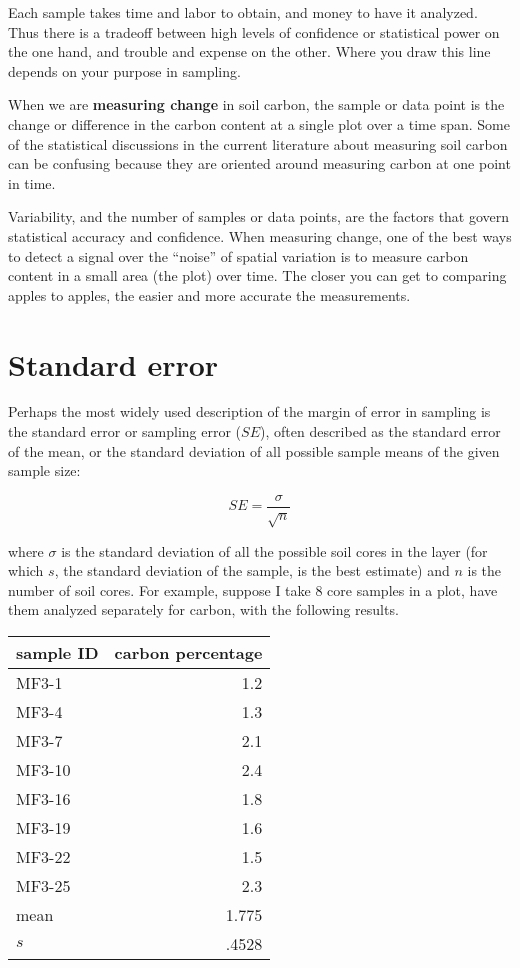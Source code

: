 \documentclass[11pt,letterpaper,oneside,onecolumn]{memoir}
\begin{document}
Each sample takes time and labor to obtain, and money to have it analyzed. Thus there is a tradeoff between high levels of confidence or statistical power on the one hand, and trouble and expense on the other. Where you draw this line depends on your purpose in sampling.

When we are \textbf{measuring change} in soil carbon, the sample or data point is the change or difference in the carbon content at a single plot over a time span. Some of the statistical discussions in the current literature about measuring soil carbon can be confusing because they are oriented around measuring carbon at one point in time.

Variability, and the number of samples or data points, are the factors that govern statistical accuracy and confidence. When measuring change, one of the best ways to detect a signal over the ``noise'' of spatial variation is to measure carbon content in a small area (the plot) over time. The closer you can get to comparing apples to apples, the easier and more accurate the measurements.

\section{Standard error}

Perhaps the most widely used description of the margin of error in sampling is the standard error or sampling error ($SE$), often described as the standard error of the mean, or the standard deviation of all possible sample means of the given sample size:

\begin{equation}SE = \frac{\sigma}{\sqrt{n}}\end{equation}

\noindent where $\sigma$ is the standard deviation of all the possible soil cores in the layer (for which $s$, the standard deviation of the sample, is the best estimate) and $n$ is the number of soil cores. For example, suppose I take 8 core samples in a plot, have them analyzed separately for carbon, with the following results.
\begin{center}
\begin{tabular}{|l|r|}\hline
sample ID&carbon percentage\\ \hline\hline
MF3-1&1.2\\ \hline
MF3-4&1.3\\ \hline
MF3-7&2.1\\ \hline
MF3-10&2.4\\ \hline
MF3-16&1.8\\ \hline
MF3-19&1.6\\ \hline
MF3-22&1.5\\ \hline
MF3-25&2.3\\ \hline\hline
mean&1.775\\ \hline
$s$&.4528\\ \hline
\end{tabular}
\end{center}
\end{document}
